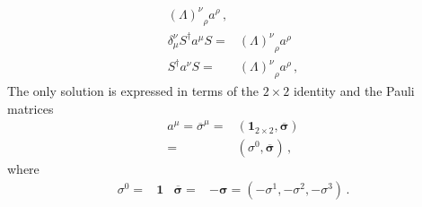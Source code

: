 \begin{frame}
\begin{align}
{\left(\Lambda\right)^\nu}_\rho a^\rho\,,\nonumber\\
\delta^{\nu}_{\mu}   S^{\dagger}a^\mu S=&
{\left(\Lambda\right)^\nu}_\rho a^\rho \nonumber\\
S^{\dagger}a^\nu S=&{\left(\Lambda\right)^\nu}_\rho a^\rho\,,
\end{align}
The only solution is expressed in terms of the $2\times2$ identity and the Pauli matrices
   \begin{align} 
 a^{\mu}=\overline{\sigma}^{\mu}=& \left( \mathbf{1}_{2\times2},\overline{\boldsymbol{\sigma}} \right) \nonumber\\
 =& \left( \sigma^0,\overline{\boldsymbol{\sigma}} \right)\,, 
\end{align}
where
\begin{align}
\sigma^0=& \mathbf{1} & \overline{\boldsymbol{\sigma}}=&-\boldsymbol{\sigma}=\left(-\sigma^1,-\sigma^2,-\sigma^3\right)\,.
\end{align}
\end{frame}

